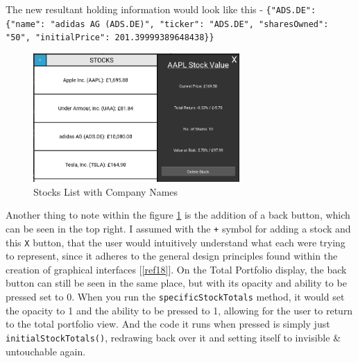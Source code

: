 \documentclass{article}
\begin{document}
The new resultant holding information would look like this - \texttt{\{"ADS.DE": \{"name": "adidas AG (ADS.DE)", "ticker": "ADS.DE", "sharesOwned": "50", "initialPrice": 201.39999389648438\}\}}\\\vspace{0.3cm}

\begin{figure}[h]
  \centering
  \includegraphics[width=0.7\textwidth]{Images/Term 2 Images/image (12).png}
  \caption{Stocks List with Company Names}
  \label{fig:Stock and Ticker Names}
\end{figure}

\vspace{0.3cm}
Another thing to note within the figure \ref{fig:Stock and Ticker Names} is the addition of a back button, which can be seen in the top right. I assumed with the \texttt{+} symbol for adding a stock and this \texttt{X} button, that the user would intuitively understand what each were trying to represent, since it adheres to the general design principles found within the creation of graphical interfaces [\ref{ref18}]. On the Total Portfolio display, the back button can still be seen in the same place, but with its opacity and ability to be pressed set to 0. When you run the \texttt{specificStockTotals} method, it would set the opacity to 1 and the ability to be pressed to 1, allowing for the user to return to the total portfolio view. And the code it runs when pressed is simply just \texttt{initialStockTotals()}, redrawing back over it and setting itself to invisible \& untouchable again.\\\vspace{0.3cm}

\newpage
\end{document}
